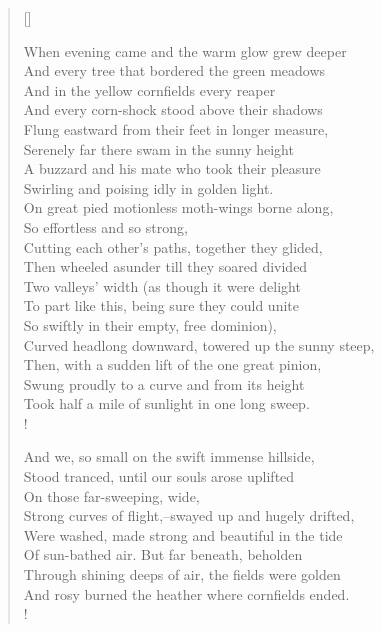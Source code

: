 \documentclass[a4paper,11pt]{article}
\begin{document}
\settowidth{\versewidth}{A buzzard and his mate who took their pleasure} %
\begin{verse}[\versewidth]


When evening came and the warm glow grew deeper \\
And every tree that bordered the green meadows \\
And in the yellow cornfields every reaper \\
And every corn-shock stood above their shadows \\
Flung eastward from their feet in longer measure, \\
Serenely far there swam in the sunny height \\
A buzzard and his mate who took their pleasure \\
Swirling and poising idly in golden light. \\
On great pied motionless moth-wings borne along, \\
\vin\vin So effortless and so strong, \\ %
Cutting each other's paths, together they glided, \\
Then wheeled asunder till they soared divided \\
Two valleys' width (as though it were delight \\
To part like this, being sure they could unite \\
So swiftly in their empty, free dominion), \\
Curved headlong downward, towered up the sunny steep, \\
Then, with a sudden lift of the one great pinion, \\
Swung proudly to a curve and from its height \\
Took half a mile of sunlight in one long sweep. \\!


And we, so small on the swift immense hillside, \\
Stood tranced, until our souls arose uplifted \\
\vin\vin On those far-sweeping, wide, \\ %
Strong curves of flight,--swayed up and hugely drifted, \\
Were washed, made strong and beautiful in the tide \\
Of sun-bathed air. But far beneath, beholden \\
Through shining deeps of air, the fields were golden \\
And rosy burned the heather where cornfields ended. \\!


\end{verse}
\end{document}
